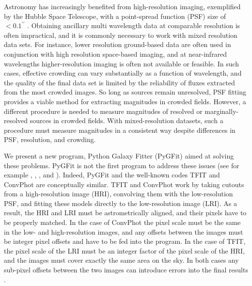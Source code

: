 \documentclass[apj]{emulateapj}
\newcommand{\pygfit}{PyGFit}
\newcommand{\tfit}{TFIT}
\newcommand{\convphot}{ConvPhot}
\begin{document}
Astronomy has increasingly benefited from high-resolution imaging, exemplified by the Hubble Space Telescope, with a point-spread function (PSF) size of $<0.1^{\prime\prime}$ \citep{wfc3handbook}.  Obtaining ancillary multi wavelength data at comparable resolution is often impractical, and it is commonly necessary to work with mixed resolution data sets.  For instance, lower resolution ground-based data are often used in conjunction with high resolution space-based imaging, and at near-infrared wavelengths higher-resolution imaging is often not available or feasible.  In such cases, effective crowding can vary substantially as a function of wavelength, and the quality of the final data set is limited by the reliability of fluxes extracted from the most crowded images.  So long as sources remain unresolved, PSF fitting provides a viable method for extracting magnitudes in crowded fields.  However, a different procedure is needed to measure magnitudes of resolved or marginally-resolved sources in crowded fields.  With mixed-resolution datasets, such a procedure must measure magnitudes in a consistent way despite differences in PSF, resolution, and crowding.

We present a new program, Python Galaxy Fitter (\pygfit{}) aimed at solving these problems.  \pygfit{} is not the first program to address these issues (see for example \citealt{soto99}, \citealt{labbe05}, \citealt{tfit}, and \citealt{desantis07}).  Indeed, \pygfit{} and the well-known codes \tfit{} \citep{tfit} and \convphot{} \citep{desantis07} are conceptually similar.  \tfit{} and \convphot{} work by taking cutouts from a high-resolution image (HRI), convolving them with the low-resolution PSF, and fitting these models directly to the low-resolution image (LRI).  As a result, the HRI and LRI must be astrometrically aligned, and their pixels have to be properly matched.  In the case of \convphot{} the pixel scale must be the same in the low- and high-resolution images, and any offsets between the images must be integer pixel offsets and have to be fed into the program.  In the case of \tfit{}, the pixel scale of the LRI must be an integer factor of the pixel scale of the HRI, and the images must cover exactly the same area on the sky.  In both cases any sub-pixel offsets between the two images can introduce errors into the final results \citep{tfit}.
\end{document}
